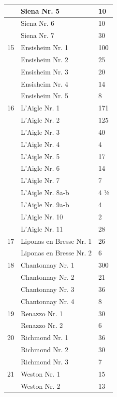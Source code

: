 \documentclass[a4paper, 11pt, oneside, polutonikogreek, german]{article}
\begin{document}
\begin{center}
\begin{longtable}{|l|l|l|}
          & Siena Nr. 5 & 10 \\ \hline
          & Siena Nr. 6 & 10 \\ \hline
          & Siena Nr. 7 & 30 \\ \hline
        15 & Ensisheim Nr. 1 & 100 \\ \hline
          & Ensisheim Nr. 2 & 25 \\ \hline
          & Ensisheim Nr. 3 & 20 \\ \hline
          & Ensisheim Nr. 4 & 14 \\ \hline
          & Ensisheim Nr. 5 & 8 \\ \hline
        16 & L’Aigle Nr. 1 & 171 \\ \hline
          & L’Aigle Nr. 2 & 125 \\ \hline
          & L’Aigle Nr. 3 & 40 \\ \hline
          & L’Aigle Nr. 4 & 4 \\ \hline
          & L’Aigle Nr. 5 & 17 \\ \hline
          & L’Aigle Nr. 6 & 14 \\ \hline
          & L’Aigle Nr. 7 & 7 \\ \hline
          & L’Aigle Nr. 8a-b & 4 ½ \\ \hline
          & L’Aigle Nr. 9a-b & 4 \\ \hline
          & L’Aigle Nr. 10 & 2 \\ \hline
          & L’Aigle Nr. 11 & 28 \\ \hline
        17 & Liponas en Bresse Nr. 1 & 26 \\ \hline
          & Liponas en Bresse Nr. 2 & 6 \\ \hline
        18 & Chantonnay Nr. 1 & 300 \\ \hline
          & Chantonnay Nr. 2 & 21 \\ \hline
          & Chantonnay Nr. 3 & 36 \\ \hline
          & Chantonnay Nr. 4 & 8 \\ \hline
        19 & Renazzo Nr. 1 & 30 \\ \hline
          & Renazzo Nr. 2 & 6 \\ \hline
        20 & Richmond Nr. 1 & 36 \\ \hline
          & Richmond Nr. 2 & 30 \\ \hline
          & Richmond Nr. 3 & 7 \\ \hline
        21 & Weston Nr. 1 & 15 \\ \hline
          & Weston Nr. 2 & 13 \\ \hline

\end{longtable}
\end{center}
\end{document}
